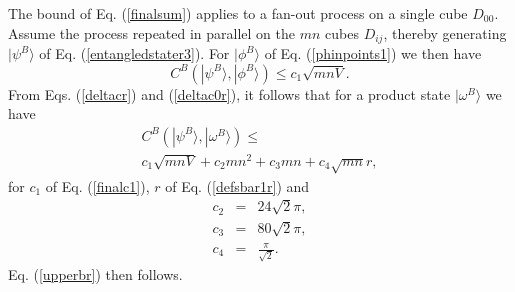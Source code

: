\documentclass[twocolumn,amsmath,amssymb]{revtex4-1}
\begin{document}
The bound of Eq. (\ref{finalsum}) applies to a fan-out process on a 
single cube $D_{00}$. Assume the process repeated in parallel on the
$mn$ cubes $D_{ij}$, thereby generating $|\psi^B \rangle $ of Eq. (\ref{entangledstater3}).
For $|\phi^B \rangle $ of Eq. (\ref{phinpoints1}) we then have
\begin{equation}
\label{psiphir}
C^B( |\psi^B \rangle , |\phi^B \rangle ) \le  c_1 \sqrt{mnV}.
\end{equation}
From Eqs. (\ref{deltacr}) and (\ref{deltac0r}), it follows that for a product state
$|\omega^B \rangle $ we have
\begin{multline}
\label{psiomegar}
C^B(|\psi^B \rangle ,|\omega^B \rangle ) \le \\ c_1 \sqrt{ mnV} + c_2 m n^2 + c_3 mn + c_4\sqrt{mn} r, 
\end{multline}
for $c_1$ of Eq. (\ref{finalc1}), $r$ of  Eq. (\ref{defsbar1r}) and 
\begin{subequations}
\begin{eqnarray}
\label{defc2r}
c_2 & = & 24 \sqrt{2} \pi, \\
\label{defc21r}
c_3 & = & 80 \sqrt{2} \pi, \\
\label{defc32r}
c_4 & = & \frac{\pi}{\sqrt{2}}.
\end{eqnarray}
\end{subequations}
Eq. (\ref{upperbr}) then follows.
\end{document}
